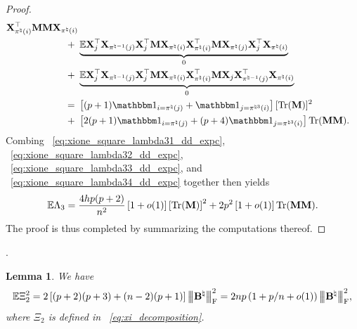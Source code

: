 \documentclass[11pt]{article}
\newtheorem{lemma}{Lemma}
\begin{document}
\begin{proof}
\begin{align}
{\bX_{\pi^{\natural}(i)}^{\rmt } \bM \bM \bX_{\pi^{\natural}(i)}
} \notag \\
+~& \underbrace{\Expc \bX_j^{\rmt}
\bX_{\pi^{\natural -1}(j)}\bX_{j}^{\rmt}
\bM
\bX_{\pi^{\natural}(i)} \bX_{\pi^{\natural}(i)}^{\rmt}
\bM
\bX_{\pi^{\natural}(j)}\bX_{j}^{\rmt}
\bX_{\pi^{\natural}(i)}}_{0} \notag \\
+~& \underbrace{\Expc \bX_j^{\rmt}
\bX_{\pi^{\natural -1}(j)}\bX_{j}^{\rmt}
\bM
\bX_{\pi^{\natural}(i)} \bX_{\pi^{\natural}(i)}^{\rmt}
\bM
\bX_{j}\bX_{\pi^{\natural -1}(j)}^{\rmt}
\bX_{\pi^{\natural}(i)}}_{0} \notag \\
=~&
\Bracket{ (p+1)\Ind_{i = \pi^{\natural}(j)} + \Ind_{j = \pi^{\natural 3}(i)}} [\trace(\bM)]^2 \notag \\
+~&
\Bracket{2(p+1)\Ind_{i = \pi^{\natural}(j)} + (p+4)\Ind_{j = \pi^{\natural 3}(i)} } \trace(\bM\bM).
\end{align}
Combing ~\eqref{eq:xione_square_lambda31_dd_expc},
~\eqref{eq:xione_square_lambda32_dd_expc}, ~\eqref{eq:xione_square_lambda33_dd_expc},
and ~\eqref{eq:xione_square_lambda34_dd_expc} together then yields
\begin{align}
\label{eq:xione_square_lambda3_dd_expc}
\mathbb{E} \Lambda_3 =
\frac{4hp(p+2)}{n^2}\left[1 + o(1)\right]\left[\operatorname{Tr}(\mathbf{M})\right]^2	
+ 2p^2\left[1 + o(1)\right]\operatorname{Tr}(\mathbf{M}\mathbf{M}).
\end{align}
The proof is thus completed by summarizing the computations thereof.
\end{proof}.

\begin{lemma}
\label{lemma:xitwo_square_expc}
We have
\[
\mathbb{E} \Xi_2^2 =
2\left[(p+2)(p+3) + (n-2)(p+1)\right]
{\left\vert\kern-0.4ex\left\vert\kern-0.4ex\left\vert \ensuremath{\mathbf{B}}^{\natural} \right\vert\kern-0.4ex\right\vert\kern-0.4ex\right\vert}_{\textup{F}}^2 =
2np\left(1 +p/n + o(1)\right){\left\vert\kern-0.4ex\left\vert\kern-0.4ex\left\vert \mathbf{B}^{\natural} \right\vert\kern-0.4ex\right\vert\kern-0.4ex\right\vert}_{\textup{F}}^2,
\]	
where $\Xi_2$ is defined in ~\eqref{eq:xi_decomposition}.
\end{lemma}
\end{document}
